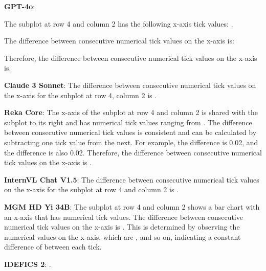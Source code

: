 \begin{wronganswer}
\textbf{GPT-4o}: \small{The subplot at row 4 and column 2 has the following x-axis tick values: .

The difference between consecutive numerical tick values on the x-axis is:

Therefore, the difference between consecutive numerical tick values on the x-axis is.}
\end{wronganswer}

\begin{wronganswer}
\textbf{Claude 3 Sonnet}: \small{The difference between consecutive numerical tick values on the x-axis for the subplot at row 4, column 2 is .}
\end{wronganswer}

\begin{wronganswer}
\textbf{Reka Core}: \small{ The x-axis of the subplot at row 4 and column 2 is shared with the subplot to its right and has numerical tick values ranging from . The difference between consecutive numerical tick values is consistent and can be calculated by subtracting one tick value from the next. For example, the difference  is 0.02, and the difference  is also 0.02. Therefore, the difference between consecutive numerical tick values on the x-axis is .}
\end{wronganswer}

\begin{wronganswer}
\textbf{InternVL Chat V1.5}: \small{The difference between consecutive numerical tick values on the x-axis for the subplot at row 4 and column 2 is .}
\end{wronganswer}

\begin{wronganswer}
\textbf{MGM HD Yi 34B}: \small{The subplot at row 4 and column 2 shows a bar chart with an x-axis that has numerical tick values. The difference between consecutive numerical tick values on the x-axis is . This is determined by observing the numerical values on the x-axis, which are , and so on, indicating a constant difference of  between each tick.}
\end{wronganswer}

\begin{wronganswer}
\textbf{IDEFICS 2}: \small{.}
\end{wronganswer}
\newpage
